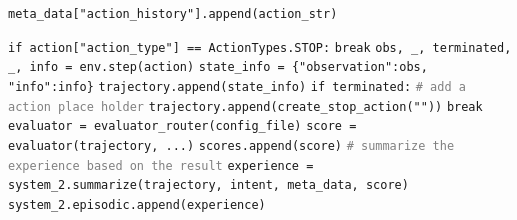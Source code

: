 \documentclass{article}
\newcommand{\pycomment}[1]{\textcolor{gray}{\texttt{\# #1}}}
\begin{document}
\begin{algorithm}
\begin{algorithmic}[1]
    \State \hspace{1em}\texttt{meta\_data["action\_history"].append(action\_str)}
    
    \State \hspace{1em}\texttt{if action["action\_type"] == ActionTypes.STOP:}
    \State \hspace{2em}\texttt{break}
    \State
    \State \hspace{1em}\texttt{obs, \_, terminated, \_, info = env.step(action)}
    \State \hspace{1em}\texttt{state\_info = \{"observation":obs, "info":info\}}
    \State \hspace{1em}\texttt{trajectory.append(state\_info)}
    \State \hspace{1em}\texttt{if terminated:} \pycomment{add a action place holder}
    \State \hspace{2em}\texttt{trajectory.append(create\_stop\_action(""))}
    \State \hspace{2em}\texttt{break}
    \State
    \State \hspace{1em}\texttt{evaluator = evaluator\_router(config\_file)}
    \State \hspace{1em}\texttt{score = evaluator(trajectory, ...)}
    \State \hspace{1em}\texttt{scores.append(score)}
    \State
    \State \hspace{1em} \pycomment{summarize the experience based on the result}
    \State \hspace{1em}\texttt{experience = system\_2.summarize(trajectory, intent, meta\_data, score)}
    \State \hspace{1em}\texttt{system\_2.episodic.append(experience)}

    \end{algorithmic}
    \end{algorithm}


\end{document}
